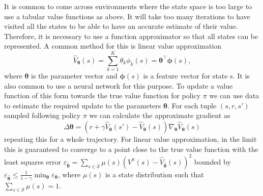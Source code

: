 It is common to come across environments where the state space is too large to use a tabular value functions as above. It will take too many iterations to have visited all the states to be able to have an accurate estimate of their value. Therefore, it is necessary to use a function approximator so that all states can be represented. A common method for this is linear value approximation
\begin{equation*}
    \hat{V}_{\boldsymbol{\theta}}(s) = \sum_{k=1}^K \theta_k \phi_k(s) = \boldsymbol{\theta}^\top \boldsymbol{\phi}(s),
\end{equation*}
where $\boldsymbol{\theta}$ is the parameter vector and $\boldsymbol{\phi}(s)$ is a feature vector for state s. It is also common to use a neural network for this purpose. To update a value function of this form towards the true value function for policy $\pi$ we can use data to estimate the required update to the parameters $\boldsymbol{\theta}$. For each tuple $(s,r,s')$ sampled following policy $\pi$ we can calculate the approximate gradient as 
\begin{equation*}
    \Delta \boldsymbol{\theta} = (r+\gamma \hat{V}_{\boldsymbol{\theta}}(s')-\hat{V}_{\boldsymbol{\theta}}(s))\nabla_{\boldsymbol{\theta}} \hat{V}_{\boldsymbol{\theta}}(s)
\end{equation*}
repeating this for a whole trajectory. For linear value approximation, in the limit this is guaranteed to converge to a point close to the true value function with the least squares error $\varepsilon_{\hat{\boldsymbol{\theta}}}=\sum_{s \in \mathcal{S}} \mu(s)(V^\pi(s)-\hat{V}_{\hat{\boldsymbol{\theta}}}(s))^2$ bounded by $\varepsilon_{\hat{\boldsymbol{\theta}}} \leq \frac{1}{1-\gamma} \min_{\boldsymbol{\theta}} \varepsilon_{\boldsymbol{\theta}}$, where $\mu(s)$ is a state distribution such that $\sum_{s \in \mathcal{S}} \mu(s) = 1$.

